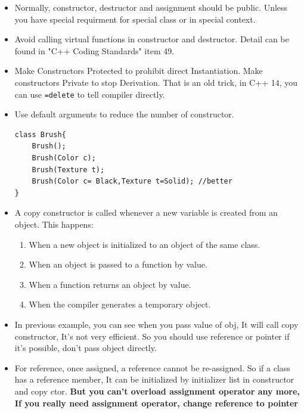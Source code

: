 \documentclass[a4paper,11pt,twoside]{book}
\begin{document}
\begin{itemize}
	\item Normally, constructor, destructor and assignment should be public. Unless you have special requirment for special class or in special context.

	\item Avoid calling virtual functions in constructor and destructor. Detail can be found in "C++ Coding Standards" item 49.
	
	\item Make Constructors Protected to prohibit direct Instantiation. Make constructors Private to stop Derivation. That is an old trick, in C++ 14, you can use \texttt{=delete} to tell compiler directly.
	
	\item Use default arguments to reduce the number of constructor.
\begin{lstlisting}[numbers=none]
class Brush{
	Brush();
	Brush(Color c);
	Brush(Texture t);
	Brush(Color c= Black,Texture t=Solid); //better
}
\end{lstlisting}
		
		\item A copy constructor is called whenever a new variable is created from an object. This happens:
		
		\begin{enumerate}
			\item When a new object is initialized to an object of the same class.
			\item When an object is passed to a function by value.
			\item When a function returns an object by value.
			\item When the compiler generates a temporary object.
		\end{enumerate}
		
		\item In previous example, you can see when you pass value of obj, It will call copy constructor, It's not very efficient. So you should use reference or pointer if it's possible, don't pass object directly.
		
		\item For reference, once assigned, a reference cannot be re-assigned. So if a class has a reference member, It can be initialized by initializer list in constructor and copy ctor. \textbf{But you can't overload assignment operator any more, If you really need assignment operator, change reference to pointer}
		
\end{itemize}
\end{document}
